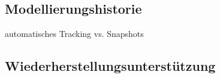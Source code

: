 
\subsection{Modellierungshistorie} %
\label{sub:modellierungshistorie}
automatisches Tracking vs. Snapshots


\subsection{Wiederherstellungsunterstützung} %
\label{sub:wiederherstellungsunterstützung}

